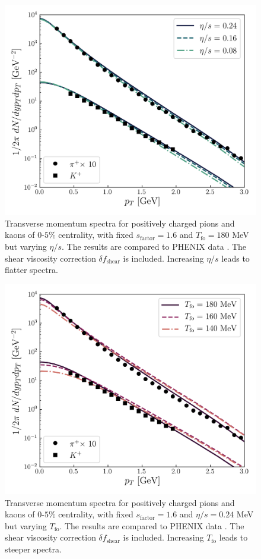 \begin{figure}[H]
	\includegraphics[width=\textwidth]{images/plot_etas_dep.png}
	\caption{\normalsize Transverse momentum spectra for positively charged pions and kaons of $0$-$5\%$ centrality, with fixed $s_\text{factor}=1.6$ and $T_\text{fo}=180$ MeV but varying $\eta/s$. The results are compared to {\sffamily PHENIX} data \cite{Adler:2003cb}. The shear viscosity correction $\delta f_\text{shear}$ is included. Increasing $\eta/s$ leads to flatter spectra.} 
\end{figure}

\vspace{-0.5cm}

\begin{figure}[H]
	\includegraphics[width=\textwidth]{images/plot_tfo_dep.png}
	\caption{\normalsize Transverse momentum spectra for positively charged pions and kaons of $0$-$5\%$ centrality, with fixed $s_\text{factor}=1.6$ and $\eta/s=0.24$ MeV but varying $T_\text{fo}$. The results are compared to {\sffamily PHENIX} data \cite{Adler:2003cb}. The shear viscosity correction $\delta f_\text{shear}$ is included. Increasing $T_\text{fo}$ leads to steeper spectra.} 
\end{figure}

